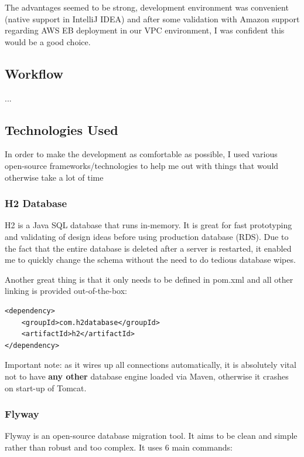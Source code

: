 The advantages seemed to be strong, development environment was convenient (native support in IntelliJ IDEA) and after some validation with Amazon support regarding AWS EB deployment in our VPC environment, I was confident this would be a good choice.

\subsection{Workflow}

...

\subsection{Technologies Used}

In order to make the development as comfortable as possible, I used various open-source frameworks/technologies to help me out with things that would otherwise take a lot of time

\subsubsection{H2 Database}

H2 is a Java SQL database that runs in-memory. It is great for fast prototyping and validating of design ideas before using production database (RDS). Due to the fact that the entire database is deleted after a server is restarted, it enabled me to quickly change the schema without the need to do tedious database wipes. 

Another great thing is that it only needs to be defined in pom.xml and all other linking is provided out-of-the-box:

\bigbreak

\begin{lstlisting}
<dependency>
    <groupId>com.h2database</groupId>
    <artifactId>h2</artifactId>
</dependency>
\end{lstlisting}

Important note: as it wires up all connections automatically, it is absolutely vital not to have {\bf any other} database engine loaded via Maven, otherwise it crashes on start-up of Tomcat.

\subsubsection{Flyway}

Flyway is an open-source database migration tool. It aims to be clean and simple rather than robust and too complex. It uses 6 main commands:

